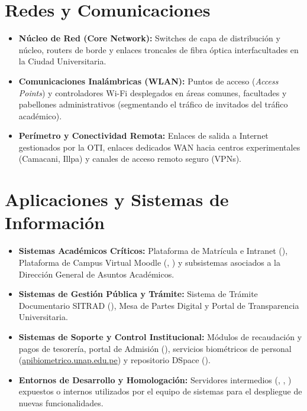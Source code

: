 \section{Redes y Comunicaciones}

\begin{itemize}[itemsep=3pt,topsep=2pt,parsep=0pt]
    \item \textbf{Núcleo de Red (Core Network):} Switches de capa de distribución y núcleo, routers de borde y enlaces troncales de fibra óptica interfacultades en la Ciudad Universitaria.

    \item \textbf{Comunicaciones Inalámbricas (WLAN):} Puntos de acceso (\textit{Access Points}) y controladores Wi-Fi desplegados en áreas comunes, facultades y pabellones administrativos (segmentando el tráfico de invitados del tráfico académico).

    \item \textbf{Perímetro y Conectividad Remota:} Enlaces de salida a Internet gestionados por la OTI, enlaces dedicados WAN hacia centros experimentales (Camacani, Illpa) y canales de acceso remoto seguro (VPNs).
\end{itemize}

\clearpage

\section{Aplicaciones y Sistemas de Información}

\begin{itemize}[itemsep=3pt,topsep=2pt,parsep=0pt]
    \item \textbf{Sistemas Académicos Críticos:} Plataforma de Matrícula e Intranet (), Plataforma de Campus Virtual Moodle (, ) y subsistemas asociados a la Dirección General de Asuntos Académicos.

    \item \textbf{Sistemas de Gestión Pública y Trámite:} Sistema de Trámite Documentario SITRAD (), Mesa de Partes Digital y Portal de Transparencia Universitaria.

    \item \textbf{Sistemas de Soporte y Control Institucional:} Módulos de recaudación y pagos de tesorería, portal de Admisión (), servicios biométricos de personal (\url{apibiometrico.unap.edu.pe}) y repositorio DSpace ().

    \item \textbf{Entornos de Desarrollo y Homologación:} Servidores intermedios (, , ) expuestos o internos utilizados por el equipo de sistemas para el despliegue de nuevas funcionalidades.
\end{itemize}

